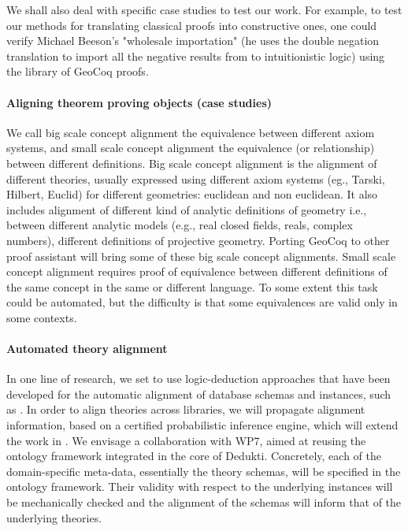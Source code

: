 We shall also deal with specific case studies to test our work.  For
example, to test our methods for translating classical proofs into
constructive ones, one could verify Michael Beeson's "wholesale
importation" (he uses the double negation translation to import all
the negative results from \cite{} to intuitionistic logic) using the
library of GeoCoq proofs.

\paragraph{Aligning theorem proving objects (case studies)}

We call big scale concept alignment the equivalence between different
axiom systems, and small scale concept alignment the equivalence (or
relationship) between different definitions.  Big scale concept
alignment is the alignment of different theories, usually expressed
using different axiom systems (eg., Tarski, Hilbert, Euclid) for
different geometries: euclidean and non euclidean. It also includes
alignment of different kind of analytic definitions of geometry i.e.,
between different analytic models (e.g., real closed fields, reals,
complex numbers), different definitions of projective
geometry. Porting GeoCoq to other proof assistant will bring some of
these big scale concept alignments.  Small scale concept alignment
requires proof of equivalence between different definitions of the
same concept in the same or different language.  To some extent this
task could be automated, but the difficulty is that some equivalences
are valid only in some contexts.

\paragraph{Automated theory alignment}

In one line of research, we set to use logic-deduction approaches that
have been developed for the automatic alignment of database schemas
and instances, such as \cite{}.  In order to align theories across
libraries, we will propagate alignment information, based on a
certified probabilistic inference engine, which will extend the work
in \cite{}. We envisage a collaboration with WP7, aimed at reusing the
ontology framework integrated in the core of Dedukti. Concretely, each
of the domain-specific meta-data, essentially the theory schemas, will
be specified in the ontology framework. Their validity with respect to
the underlying instances will be mechanically checked and the
alignment of the schemas will inform that of the underlying theories.


